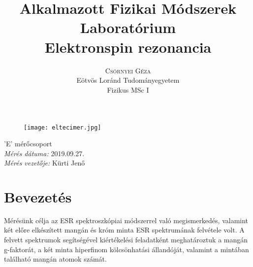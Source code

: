 \documentclass[12pt,a4paper]{article}
\title{\huge{Alkalmazott Fizikai Módszerek Laboratórium}\\ \vspace{20pt}
\textbf{Elektronspin rezonancia}}
\author{\Large{\textsc{Csörnyei Géza}} \vspace{10pt}\\
	\textrm{Eötvös Loránd Tudományegyetem}\\
	\textrm{Fizikus MSc I}
	}
\date{}
\begin{document}
\addtolength{\voffset}{-1.0cm}
\addtolength{\textheight}{1.0cm}
\begin{titlepage}
\maketitle

\begin{figure}[!htb]
\centering
\texttt{[image: eltecimer.jpg]}
\end{figure}

\hfil \Large{'E' mérőcsoport}\hfil  \\
\vspace*{2pt}
\hfil \Large{\emph{Mérés dátuma:} 2019.09.27.}\hfil \\
\vspace*{2pt}
\hfil \hspace*{45pt} \Large{\emph{Mérés vezetője:} Kürti Jenő}\hfil
\thispagestyle{empty}
\end{titlepage}

\section{Bevezetés}
\hspace*{10pt} Mérésünk célja az ESR spektroszkópiai módszerrel való megismerkedés, valamint két előre elkészített mangán és króm minta ESR spektrumának felvétele volt. A felvett spektrumok segítségével kiértékelési feladatként meghatároztuk a mangán g-faktorát, a két minta hiperfinom kölcsönhatási állandóját, valamint a mintában található mangán atomok számát.
\end{document}

